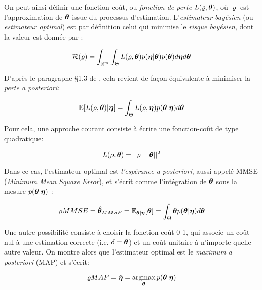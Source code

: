 On peut ainsi définir une fonction-coût, ou \textit{fonction de perte} $L(\varrho, {\bm{\theta}})$, où $\varrho$ est l'approximation de ${\bm{\theta}}$ issue du processus d'estimation. L'\textit{estimateur bayésien} (ou \textit{estimateur optimal}) est par définition celui qui minimise le \textit{risque bayésien}, dont la valeur est donnée par : 

\begin{equation}
\mathcal{R}(\varrho) = \int_{\mathbb{R}^m} \int_{\Theta} L(\varrho,{\bm{\theta}})p({\bm{\eta}} | {\bm{\theta}})p({\bm{\theta}}) d{\bm{\eta}} d{\bm{\theta}}
\label{eq_risque_bayesien}
\end{equation}

D'après le paragraphe §1.3 de \cite{Robert2004}, cela revient de façon équivalente à minimiser la \textit{perte a posteriori}:

\begin{equation}
\mathbb{E}[L(\varrho,{\bm{\theta}})|{\bm{\eta}}] = \int_{\Theta} L(\varrho,{\bm{\eta}}){p({\bm{\theta}} | {\bm{\eta}})} d{\bm{\theta}}
\label{eq_perte_a_posteriori}
\end{equation}

Pour cela, une approche courant consiste à écrire une fonction-coût de type quadratique:

\begin{equation}
L(\varrho,{\bm{\theta}}) = || \varrho - {\bm{\theta}} ||^2
\label{eq_fonction_cout_bayesien_quadratique}
\end{equation}
	
Dans ce cas, l'estimateur optimal est \textit{l'espérance a posteriori}, aussi appelé MMSE (\textit{Minimum Mean Square Error}), et s'écrit comme l'intégration de ${\bm{\theta}}$ sous la mesure $p({\bm{\theta}} | {\bm{\eta}})$ : 

\begin{equation}
\varrho{MMSE} = \hat{{\bm{\theta}}}_{MMSE} = \mathbb{E}_{{\bm{\theta}} | {\bm{\eta}}}[{\bm{\theta}}] = \int_{\Theta}{\bm{\theta}} {p({\bm{\theta}} | {\bm{\eta}})} d{\bm{\theta}}
\label{eq_definition_mmse}
\end{equation}

Une autre possibilité consiste à choisir la fonction-coût 0-1, qui associe un coût nul à une estimation correcte (i.e. $\delta = {\bm{\theta}}$) et un coût unitaire à n'importe quelle autre valeur. On montre alors que l'estimateur optimal est le \textit{maximum a posteriori} (MAP) et s'écrit: 

\begin{equation}
\varrho{MAP} = \hat{{\bm{\eta}}} = \operatorname*{\arg\!\max}_{{\bm{\theta}}} {p({\bm{\theta}} | {\bm{\eta}})}
\label{eq_definition_map}
\end{equation}

